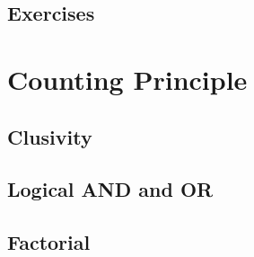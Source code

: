 \subsection{Exercises}

\newpage
\section{Counting Principle}
\subsection{Clusivity}
\noindent{}
\subsection{Logical AND and OR}
\subsection{Factorial}
